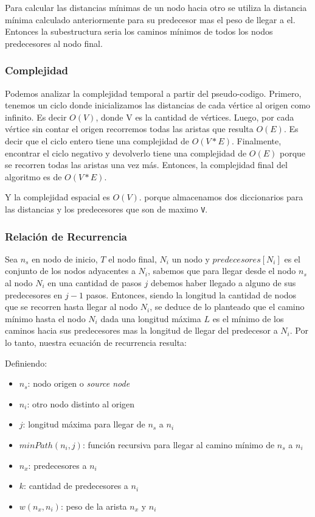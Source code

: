 \documentclass[titlepage,a4paper]{article}
\begin{document}
Para calcular las distancias mínimas de un nodo hacia otro se utiliza la
distancia mínima calculado anteriormente para su predecesor mas el peso de
llegar a el. Entonces la subestructura seria los caminos mínimos de todos los
nodos predecesores al nodo final.

\subsubsection{Complejidad}
\label{sec:orgbbcdf2c}

Podemos analizar la complejidad temporal a partir del pseudo-codigo. Primero,
tenemos un ciclo donde inicializamos las distancias de cada vértice al origen
como infinito. Es decir \(O(V)\), donde V es la cantidad de vértices. Luego, por
cada vértice sin contar el origen recorremos todas las aristas que resulta
\(O(E)\). Es decir que el ciclo entero tiene una complejidad de \(O(V * E)\).
Finalmente, encontrar el ciclo negativo y devolverlo tiene una complejidad de
\(O(E)\) porque se recorren todas las aristas una vez más.  Entonces, la
complejidad final del algoritmo es de \(O(V * E)\).

Y la complejidad espacial es \(O(V)\). porque almacenamos dos diccionarios para
las distancias y los predecesores que son de maximo \texttt{V}.

\subsubsection{Relación de Recurrencia}
\label{sec:org6078ab9}

Sea \(n_s\) en nodo de inicio, \(T\) el nodo final, \(N_i\) un nodo y \(predecesores[N_i]\) es el
conjunto de los nodos adyacentes a \(N_i\), sabemos que para llegar desde el nodo \(n_s\)
al nodo \(N_i\) en una cantidad de pasos \(j\) debemos haber llegado a alguno de sus
predecesores en \(j-1\) pasos. Entonces, siendo la longitud la cantidad de nodos que
se recorren hasta llegar al nodo \(N_i\), se deduce de lo planteado que el camino
mínimo hasta el nodo \(N_i\) dada una longitud máxima \(L\) es el mínimo de los caminos
hacia sus predecesores mas la longitud de llegar del predecesor a \(N_i\). Por lo
tanto, nuestra ecuación de recurrencia resulta:

Definiendo:
\begin{itemize}
\item \(n_s\): nodo origen o \emph{source node}
\item \(n_i\): otro nodo distinto al origen
\item \(j\): longitud máxima para llegar de \(n_s\) a \(n_i\)
\item \(minPath(n_i, j)\): función recursiva para llegar al camino mínimo de \(n_s\) a \(n_i\)
\item \(n_x\): predecesores a \(n_i\)
\item \(k\): cantidad de predecesores a \(n_i\)
\item \(w(n_x,n_i)\): peso de la arista \(n_x\) y \(n_i\)
\end{itemize}
\end{document}
